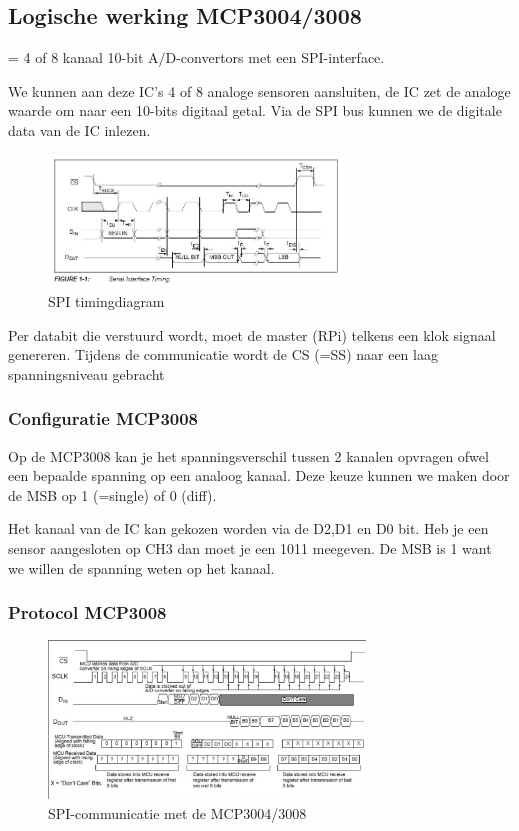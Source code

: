 \documentclass{article}
\begin{document}
\subsection{Logische werking MCP3004/3008}
= 4 of 8 kanaal 10-bit A/D-convertors met een SPI-interface.

We kunnen aan deze IC's 4 of 8 analoge sensoren aansluiten, de IC zet de analoge waarde om naar een 10-bits digitaal getal.
Via de SPI bus kunnen we de digitale data van de IC inlezen. 

\begin{figure}[H]
    \centering
    \includegraphics[width=0.7\textwidth]{timing-spi.png}
    \caption{SPI timingdiagram}
\end{figure}

Per databit die verstuurd wordt, moet de master (RPi) telkens een klok signaal genereren.
Tijdens de communicatie wordt de CS (=SS) naar een laag spanningsniveau gebracht

\subsubsection{Configuratie MCP3008}

Op de MCP3008 kan je het spanningsverschil tussen 2 kanalen opvragen ofwel een bepaalde spanning op een
analoog kanaal. Deze keuze kunnen we maken door de MSB op 1 (=single) of 0 (diff).

Het kanaal van de IC kan gekozen worden via de D2,D1 en D0 bit. 
Heb je een sensor aangesloten op CH3 dan moet je een 1011 meegeven. 
De MSB is 1 want we willen de spanning weten op het kanaal.

\subsubsection{Protocol MCP3008}

\begin{figure}[H]
    \centering
    \includegraphics[width=0.75\textwidth]{timing-spi-mcp.png}
    \caption{SPI-communicatie met de MCP3004/3008}
\end{figure}
\end{document}
